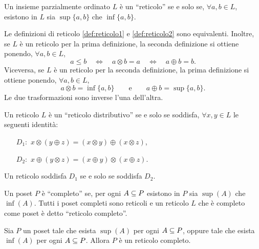 \begin{definizione}
\label{def:reticolo2}
Un insieme parzialmente ordinato $L$ \`e un ``reticolo'' se e solo se,
$\forall a,b \in L$, esistono in $L$ sia $\sup\{a,b\}$ che $\inf\{a,b\}$.
\end{definizione}

\begin{proposizione}
{\rm \cite{BS81}} Le definizioni di reticolo
{\rm\ref{def:reticolo1}} e {\rm\ref{def:reticolo2}} sono equivalenti. Inoltre, se $L$ \`e
un reticolo per la prima definizione, la seconda definizione si ottiene
ponendo, $\forall a,b \in L$,
\[
    a \leq b \quad\iff\quad a \otimes b = a \quad\iff\quad a \oplus b = b.
\]
Viceversa, se $L$ \`e un reticolo per la seconda definizione,
la prima definizione si ottiene ponendo, $\forall a,b \in L$,
\[
    a \otimes b = \inf\{a,b\} \qquad\mbox{e}\qquad a \oplus b = \sup\{a,b\}.
\]
Le due trasformazioni sono inverse l'una dell'altra.
\end{proposizione}

\begin{definizione}
Un reticolo $L$ \`e un ``reticolo distributivo'' se e solo se soddisfa,
$\forall x, y \in L$ le seguenti identit\`a:
\begin{itemize}
\item[$D_1:$] $x \otimes (y \oplus   z) = (x \otimes y) \oplus  (x \otimes z)$,
\item[$D_2:$] $x \oplus  (y \otimes  z) = (x \oplus  y) \otimes (x \oplus  z)$.
\end{itemize}
\end{definizione}

\begin{proposizione}
{\rm \cite{BS81}} Un reticolo soddisfa $D_1$ se e solo se soddisfa $D_2$.
\end{proposizione}

\begin{definizione}
Un poset $P$ \`e ``completo'' se, per ogni $A \subseteq P$ esistono in $P$ sia
$\sup(A)$ che $\inf(A)$. Tutti i poset completi sono reticoli e un reticolo
$L$ che \`e completo come poset \`e detto ``reticolo completo''.
\end{definizione}

\begin{proposizione}
\label{prop:complete-lattice0}
{\rm \cite{BS81}} Sia $P$ un poset tale che esista $\sup(A)$ per ogni $A \subseteq P$,
oppure tale che esista $\inf(A)$ per ogni $A \subseteq P$. Allora $P$ \`e un reticolo
completo.
\end{proposizione}

